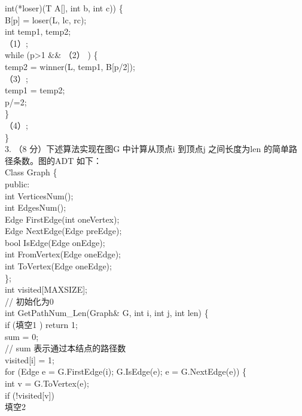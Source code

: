 \begin{question}
int(*loser)(T A[], int b, int c)) \{\\
B[p] = loser(L, lc, rc);\\
int temp1, temp2;\\
（1）\underline{\hspace{12em}};\\
while (p>1 \&\& （2） \underline{\hspace{4em}} ) \{\\
temp2 = winner(L, temp1, B[p/2]);\\
（3）\underline{\hspace{12em}};\\
temp1 = temp2;\\
p/=2;\\
\}\\
（4）\underline{\hspace{12em}};\\
\}\\
3. （8 分）下述算法实现在图G 中计算从顶点i 到顶点j 之间长度为len 的简单路\\
径条数。图的ADT 如下：\\
Class Graph \{\\
public:\\
int VerticesNum();\\
int EdgesNum();\\
Edge FirstEdge(int oneVertex);\\
Edge NextEdge(Edge preEdge);\\
bool IsEdge(Edge onEdge);\\
int FromVertex(Edge oneEdge);\\
int ToVertex(Edge oneEdge);\\
\};\\
int visited[MAXSIZE];\\
// 初始化为0\\
int GetPathNum\_Len(Graph\& G, int i, int j, int len)  \{\\
if (填空1 \underline{\hspace{12em}}) return 1;\\
sum = 0;\\
// sum 表示通过本结点的路径数\\
visited[i] = 1;\\
for (Edge e = G.FirstEdge(i); G.IsEdge(e); e = G.NextEdge(e)) \{\\
int v = G.ToVertex(e);\\
if (!visited[v])\\
填空2 \underline{\hspace{12em}}\\

\end{question}
